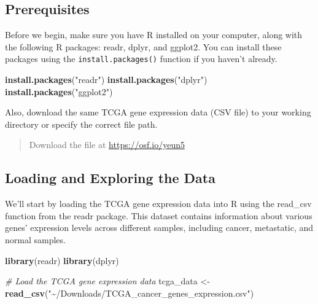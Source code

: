 \documentclass[
]{book}
\newenvironment{Shaded}{\begin{snugshade}}{\end{snugshade}}
\newcommand{\CommentTok}[1]{\textcolor[rgb]{0.56,0.35,0.01}{\textit{#1}}}
\newcommand{\FunctionTok}[1]{\textcolor[rgb]{0.13,0.29,0.53}{\textbf{#1}}}
\newcommand{\NormalTok}[1]{#1}
\newcommand{\OtherTok}[1]{\textcolor[rgb]{0.56,0.35,0.01}{#1}}
\newcommand{\StringTok}[1]{\textcolor[rgb]{0.31,0.60,0.02}{#1}}
\begin{document}
\hypertarget{prerequisites-1}{%
\subsection{Prerequisites}\label{prerequisites-1}}

Before we begin, make sure you have R installed on your computer, along with the following R packages: readr, dplyr, and ggplot2. You can install these packages using the \texttt{install.packages()} function if you haven't already.

\begin{Shaded}
\begin{Highlighting}[]
\FunctionTok{install.packages}\NormalTok{(}\StringTok{"readr"}\NormalTok{)}
\FunctionTok{install.packages}\NormalTok{(}\StringTok{"dplyr"}\NormalTok{)}
\FunctionTok{install.packages}\NormalTok{(}\StringTok{"ggplot2"}\NormalTok{)}
\end{Highlighting}
\end{Shaded}

Also, download the same TCGA gene expression data (CSV file) to your working directory or specify the correct file path.

\begin{quote}
Download the file at \url{https://osf.io/yeun5}
\end{quote}

\hypertarget{loading-and-exploring-the-data}{%
\subsection{Loading and Exploring the Data}\label{loading-and-exploring-the-data}}

We'll start by loading the TCGA gene expression data into R using the read\_csv function from the readr package. This dataset contains information about various genes' expression levels across different samples, including cancer, metastatic, and normal samples.

\begin{Shaded}
\begin{Highlighting}[]
\FunctionTok{library}\NormalTok{(readr)}
\FunctionTok{library}\NormalTok{(dplyr)}

\CommentTok{\# Load the TCGA gene expression data}
\NormalTok{tcga\_data }\OtherTok{\textless{}{-}} \FunctionTok{read\_csv}\NormalTok{(}\StringTok{"\textasciitilde{}/Downloads/TCGA\_cancer\_genes\_expression.csv"}\NormalTok{)}
\end{Highlighting}
\end{Shaded}
\end{document}

